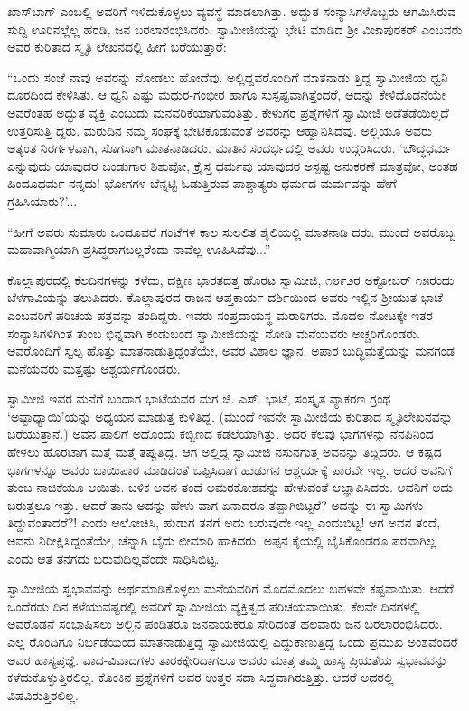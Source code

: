 ಖಾಸ್​ಬಾಗ್ ಎಂಬಲ್ಲಿ ಅವರಿಗೆ ಇಳಿದುಕೊಳ್ಳಲು ವ್ಯವಸ್ಥೆ ಮಾಡಲಾಗಿತ್ತು. ಅದ್ಭುತ ಸಂನ್ಯಾಸಿಗಳೊಬ್ಬರು ಆಗಮಿಸಿರುವ ಸುದ್ದಿ ಊರಿನಲ್ಲೆಲ್ಲ ಹರಡಿ, ಜನ ಬರಲಾರಂಭಿಸಿದರು. ಸ್ವಾಮೀಜಿಯನ್ನು ಭೇಟಿ ಮಾಡಿದ ಶ್ರೀ ವಿಜಾಪುರಕರ್ ಎಂಬವರು ಅವರ ಕುರಿತಾದ ಸ್ಮೃತಿ ಲೇಖನದಲ್ಲಿ ಹೀಗೆ ಬರೆಯುತ್ತಾರೆ:

“ಒಂದು ಸಂಜೆ ನಾವು ಅವರನ್ನು ನೋಡಲು ಹೋದೆವು. ಅಲ್ಲಿದ್ದವರೊಂದಿಗೆ ಮಾತನಾಡು ತ್ತಿದ್ದ ಸ್ವಾಮೀಜಿಯ ಧ್ವನಿ ದೂರದಿಂದ ಕೇಳಿಸಿತು. ಆ ಧ್ವನಿ ಎಷ್ಟು ಮಧುರ-ಗಂಭೀರ ಹಾಗೂ ಸುಸ್ಪಷ್ಟವಾಗಿತ್ತೆಂದರೆ, ಅದನ್ನು ಕೇಳಿದೊಡನೆಯೇ ಅವರೆಂತಹ ಅದ್ಭುತ ವ್ಯಕ್ತಿ ಎಂಬುದು ಮನವರಿಕೆಯಾಗುವಂತಿತ್ತು. ಕೇಳುಗರ ಪ್ರಶ್ನೆಗಳಿಗೆ ಸ್ವಾಮೀಜಿ ಅಡೆತಡೆಯಿಲ್ಲದೆ ಉತ್ತರಿಸುತ್ತಿ ದ್ದರು. ಮರುದಿನ ನಮ್ಮ ಸಂಘಕ್ಕೆ ಭೇಟಿಕೊಡುವಂತೆ ಅವರನ್ನು ಆಹ್ವಾನಿಸಿದೆವು. ಅಲ್ಲಿಯೂ ಅವರು ಅತ್ಯಂತ ನಿರರ್ಗಳವಾಗಿ, ಸೊಗಸಾಗಿ ಮಾತನಾಡಿದರು. ಮಾತಿನ ಸಂದರ್ಭದಲ್ಲಿ ಅವರು ಉದ್ಗರಿಸಿದರು. ‘ಬೌದ್ಧಧರ್ಮ ಎನ್ನುವುದು ಯಾವುದರ ಬಂಡುಗಾರ ಶಿಶುವೋ, ಕ್ರೈಸ್ತ ಧರ್ಮವು ಯಾವುದರ ಅಸ್ಪಷ್ಟ ಅನುಕರಣೆ ಮಾತ್ರವೋ, ಅಂತಹ ಹಿಂದೂಧರ್ಮ ನನ್ನದು! ಭೋಗಗಳ ಬೆನ್ನಟ್ಟಿ ಓಡುತ್ತಿರುವ ಪಾಶ್ಚಾತ್ಯರು ಧರ್ಮದ ಮರ್ಮವನ್ನು ಹೇಗೆ ಗ್ರಹಿಸಿಯಾರು?’...

“ಹೀಗೆ ಅವರು ಸುಮಾರು ಒಂದೂವರೆ ಗಂಟೆಗಳ ಕಾಲ ಸುಲಲಿತ ಶೈಲಿಯಲ್ಲಿ ಮಾತನಾಡಿ ದರು. ಮುಂದೆ ಅವರೊಬ್ಬ ಮಹಾವಾಗ್ಮಿಯಾಗಿ ಪ್ರಸಿದ್ಧರಾಗಬಲ್ಲರೆಂದು ನಾವೆಲ್ಲ ಊಹಿಸಿದೆವು...”

ಕೊಲ್ಲಾಪುರದಲ್ಲಿ ಕೆಲದಿನಗಳನ್ನು ಕಳೆದು, ದಕ್ಷಿಣ ಭಾರತದತ್ತ ಹೊರಟ ಸ್ವಾಮೀಜಿ, ೧೮೯೨ರ ಅಕ್ಟೋಬರ್ ೧೫ರಂದು ಬೆಳಗಾವಿಯನ್ನು ತಲುಪಿದರು. ಕೊಲ್ಲಾಪುರದ ರಾಜನ ಆಪ್ತಕಾರ್ಯ ದರ್ಶಿಯಿಂದ ಅವರು ಇಲ್ಲಿನ ಶ್ರೀಯುತ ಭಾಟೆ ಎಂಬವರಿಗೆ ಪರಿಚಯ ಪತ್ರವನ್ನು ತಂದಿದ್ದರು. ಇವರು ಸಂಪ್ರದಾಯಸ್ಥ ಮರಾಠಿಗರು. ಮೊದಲ ನೋಟಕ್ಕೇ ಇತರ ಸಂನ್ಯಾಸಿಗಳಿಗಿಂತ ತುಂಬ ಭಿನ್ನವಾಗಿ ಕಂಡುಬಂದ ಸ್ವಾಮೀಜಿಯನ್ನು ನೋಡಿ ಮನೆಯವರು ಅಚ್ಚರಿಗೊಂಡರು. ಅವರೊಂದಿಗೆ ಸ್ವಲ್ಪ ಹೊತ್ತು ಮಾತನಾಡುತ್ತಿದ್ದಂತೆಯೇ, ಅವರ ವಿಶಾಲ ಜ್ಞಾನ, ಅಪಾರ ಬುದ್ಧಿಮತ್ತೆಯನ್ನು ಮನಗಂಡ ಮನೆಯವರು ಮತ್ತಷ್ಟು ಆಶ್ಚರ್ಯಗೊಂಡರು.

ಸ್ವಾಮೀಜಿ ಇವರ ಮನೆಗೆ ಬಂದಾಗ ಭಾಟೆಯವರ ಮಗ ಜಿ. ಎಸ್. ಭಾಟೆ, ಸಂಸ್ಕೃತ ವ್ಯಾಕರಣ ಗ್ರಂಥ ‘ಅಷ್ಟಾಧ್ಯಾಯಿ’ಯನ್ನು ಅಧ್ಯಯನ ಮಾಡುತ್ತ ಕುಳಿತಿದ್ದ. (ಮುಂದೆ ಇವನೇ ಸ್ವಾಮೀಜಿಯ ಕುರಿತಾದ ಸ್ಮೃತಿಲೇಖನವನ್ನು ಬರೆಯುತ್ತಾನೆ.) ಅವನ ಪಾಲಿಗೆ ಅದೊಂದು ಕಬ್ಬಿಣದ ಕಡಲೆಯಾಗಿತ್ತು. ಅದರ ಕೆಲವು ಭಾಗಗಳನ್ನು ನೆನಪಿನಿಂದ ಹೇಳಲು ಹೊರಟಾಗ ಮತ್ತೆ ಮತ್ತೆ ತಪ್ಪುತ್ತಿದ್ದ. ಆಗ ಅಲ್ಲಿದ್ದ ಸ್ವಾಮೀಜಿ ನಸುನಗುತ್ತ ಅವನನ್ನು ತಿದ್ದಿದರು. ಆ ಕಷ್ಟದ ಭಾಗಗಳನ್ನೂ ಅವರು ಬಾಯಿಪಾಠ ಮಾಡಿದಂತೆ ಒಪ್ಪಿಸಿದಾಗ ಹುಡುಗನ ಆಶ್ಚರ್ಯಕ್ಕೆ ಪಾರವೇ ಇಲ್ಲ. ಆದರೆ ಅವನಿಗೆ ತುಂಬ ನಾಚಿಕೆಯೂ ಆಯಿತು. ಬಳಿಕ ಅವನ ತಂದೆ ಅಮರಕೋಶವನ್ನು ಹೇಳುವಂತೆ ಆಜ್ಞಾಪಿಸಿದರು. ಅವನಿಗೆ ಅದು ಬರುತ್ತಲೂ ಇತ್ತು. ಆದರೆ ತಾನು ಅದನ್ನು ಹೇಳು ವಾಗ ಏನಾದರೂ ತಪ್ಪಾಗಿಬಿಟ್ಟರೆ? ಅದನ್ನು ಈ ಸ್ವಾಮಿಗಳು ತಿದ್ದುವಂತಾದರೆ?! ಎಂದು ಆಲೋಚಿಸಿ, ಹುಡುಗ ತನಗೆ ಅದು ಬರುವುದೇ ಇಲ್ಲ ಎಂದುಬಿಟ್ಟ! ಆಗ ಅವನ ತಂದೆ, ಅವನು ನಿರೀಕ್ಷಿಸಿದ್ದಂತೆಯೇ, ಚೆನ್ನಾಗಿ ಬೈದು ಛೀಮಾರಿ ಹಾಕಿದರು. ಅಪ್ಪನ ಕೈಯಲ್ಲಿ ಬೈಸಿಕೊಂಡರೂ ಪರವಾಗಿಲ್ಲ ಎಂದು ಆತ ತನಗದು ಬರುವುದಿಲ್ಲವೆಂದೇ ಸಾಧಿಸಿಬಿಟ್ಟ.

ಸ್ವಾಮೀಜಿಯ ಸ್ವಭಾವವನ್ನು ಅರ್ಥಮಾಡಿಕೊಳ್ಳಲು ಮನೆಯವರಿಗೆ ಮೊದಮೊದಲು ಬಹಳವೇ ಕಷ್ಟವಾಯಿತು. ಆದರೆ ಒಂದೆರಡು ದಿನ ಕಳೆಯುವಷ್ಟರಲ್ಲಿ ಅವರಿಗೆ ಸ್ವಾಮೀಜಿಯ ವ್ಯಕ್ತಿತ್ವದ ಪರಿಚಯವಾಯಿತು. ಕೆಲವೇ ದಿನಗಳಲ್ಲಿ ಅವರೊಡನೆ ಸಂಭಾಷಿಸಲು ಅಲ್ಲಿನ ಪಂಡಿತರೂ ಜನನಾಯಕರೂ ಸೇರಿದಂತೆ ಹಲವಾರು ಜನ ಬರಲಾರಂಭಿಸಿದರು. ಎಲ್ಲ ರೊಂದಿಗೂ ನಿರ್ಭಿಡೆಯಿಂದ ಮಾತನಾಡುತ್ತಿದ್ದ ಸ್ವಾಮೀಜಿಯಲ್ಲಿ ಎದ್ದುಕಾಣುತ್ತಿದ್ದ ಒಂದು ಪ್ರಮುಖ ಅಂಶವೆಂದರೆ ಅವರ ಹಾಸ್ಯಪ್ರಜ್ಞೆ. ವಾದ-ವಿವಾದಗಳು ತಾರಕಕ್ಕೇರಿದಾಗಲೂ ಅವರು ಮಾತ್ರ ತಮ್ಮ ಹಾಸ್ಯ ಪ್ರಿಯತೆಯ ಸ್ವಭಾವವನ್ನು ಕಳೆದುಕೊಳ್ಳುತ್ತಿರಲಿಲ್ಲ. ಕೊಂಕಿನ ಪ್ರಶ್ನೆಗಳಿಗೆ ಅವರ ಉತ್ತರ ಸದಾ ಸಿದ್ಧವಾಗಿರುತ್ತಿತ್ತು. ಆದರೆ ಅದರಲ್ಲಿ ವಿಷವಿರುತ್ತಿರಲಿಲ್ಲ.

